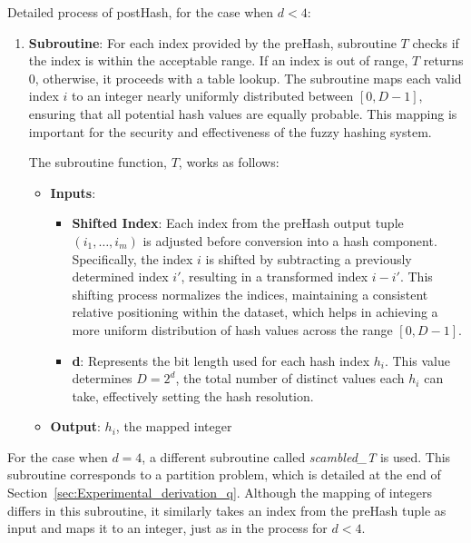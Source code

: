 Detailed process of postHash, for the case when $d < 4$:
\begin{enumerate}
    \item \textbf{Subroutine}: For each index provided by the preHash, subroutine \(T\) checks if the index is within the acceptable range. If an index is out of range, \(T\) returns 0, otherwise, it proceeds with a table lookup. The subroutine maps each valid index \(i\) to an integer nearly uniformly distributed between \([0, D-1]\), ensuring that all potential hash values are equally probable. This mapping is important for the security and effectiveness of the fuzzy hashing system.
    
    The subroutine function, \(T\), works as follows:
    \begin{itemize}
        \item \textbf{Inputs}: 
        \begin{itemize}
            \item \textbf{Shifted Index}: Each index from the preHash output tuple \((i_1, \ldots, i_m)\) is adjusted before conversion into a hash component. Specifically, the index \(i\) is shifted by subtracting a previously determined index \(i'\), resulting in a transformed index \(i - i'\). This shifting process normalizes the indices, maintaining a consistent relative positioning within the dataset, which helps in achieving a more uniform distribution of hash values across the range \([0, D-1]\).
            \item \textbf{d}: Represents the bit length used for each hash index \(h_i\). This value determines \(D = 2^d\), the total number of distinct values each \(h_i\) can take, effectively setting the hash resolution.
        \end{itemize}
        \item \textbf{Output}: \(h_i\), the mapped integer
    \end{itemize}
\end{enumerate}

For the case when $d = 4$, a different subroutine called \textit{scambled\_T} is used. This subroutine corresponds to a partition problem, which is detailed at the end of Section~\ref{sec:Experimental_derivation_q}. Although the mapping of integers differs in this subroutine, it similarly takes an index from the preHash tuple as input and maps it to an integer, just as in the process for $d < 4$.

\vspace{20pt}

